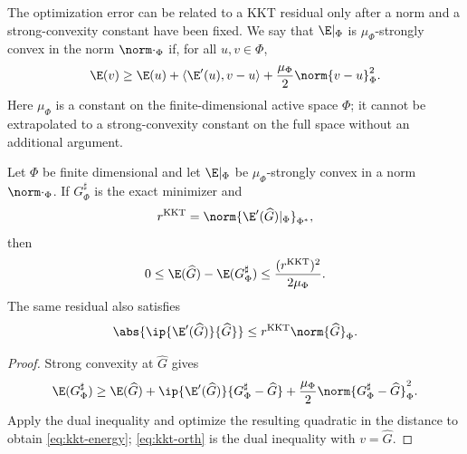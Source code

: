 The optimization error can be related to a KKT residual only after a norm and a strong-convexity
constant have been fixed. We say that $\E|_\Phi$ is $\mu_\Phi$-strongly convex in the norm
$\norm\cdot_\Phi$ if, for all $u,v\in\Phi$,
\[
 \E(v)\geq \E(u)+\langle\E'(u),v-u\rangle
       +\frac{\mu_\Phi}{2}\norm{v-u}_\Phi^2 .
\]
Here $\mu_\Phi$ is a constant on the finite-dimensional active space $\Phi$; it
cannot be extrapolated to a strong-convexity constant on the full space without an
additional argument.

\begin{lemma}
\label{lem:kkt}
Let \(\Phi\) be finite dimensional and let \(\E|_\Phi\) be \(\mu_\Phi\)-strongly convex in a norm
\(\norm\cdot_\Phi\). If \(G_\Phi^{\sharp}\) is the exact minimizer and
\[
 r^{\mathrm{KKT}}=\norm{\E'(\widehat G)|_\Phi}_{\Phi^*},
\]
then
\begin{equation}
 0\leq\E(\widehat G)-\E(G_\Phi^{\sharp})
 \leq\frac{(r^{\mathrm{KKT}})^2}{2\mu_\Phi}.
\label{eq:kkt-energy}
\end{equation}
The same residual also satisfies
\begin{equation}
 \abs{\ip{\E'(\widehat G)}{\widehat G}}
 \leq r^{\mathrm{KKT}}\norm{\widehat G}_\Phi.
\label{eq:kkt-orth}
\end{equation}
\end{lemma}

\begin{proof}
Strong convexity at \(\widehat G\) gives
\[
 \E(G_\Phi^{\sharp})\geq\E(\widehat G)+
 \ip{\E'(\widehat G)}{G_\Phi^{\sharp}-\widehat G}
 +\frac{\mu_\Phi}{2}\norm{G_\Phi^{\sharp}-\widehat G}_\Phi^2.
\]
Apply the dual inequality and optimize the resulting quadratic in the distance to obtain
\cref{eq:kkt-energy}; \cref{eq:kkt-orth} is the dual inequality with
\(v=\widehat G\).
\end{proof}
